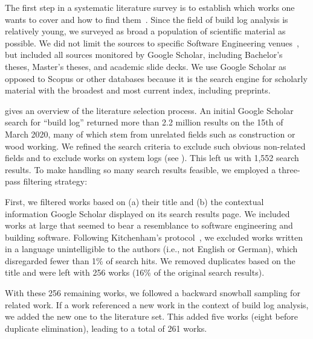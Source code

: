 \documentclass[10pt,journal,compsoc]{IEEEtran}
\begin{document}
The first step in a systematic literature survey is to
establish which works one wants to cover and how to find
them~\cite{kitchenham2009systematic}.
Since the field of build log analysis is relatively young, we
surveyed as broad a population of scientific material as possible.
We did not limit the sources to specific Software Engineering
venues~\cite{petersen2015guidelines}, but included all sources
monitored by Google Scholar, including Bachelor's theses, Master's
theses, and academic slide decks.
We use Google Scholar as opposed to Scopus or
other databases because it is the search engine for scholarly material
with
the broadest and most current index, including preprints.

 gives an overview of the literature selection
process.
An initial Google Scholar search for ``build log''
returned more than 2.2 million results on the 15th of March 2020, many
of which stem
from unrelated fields such as construction or wood working.
We refined the search criteria to exclude such obvious
non-related fields and to exclude works on system
logs (see ).
This left us with 1,552 search results.
To make handling so many search results feasible, we employed a
three-pass filtering strategy:

First, we filtered works based on (a) their title and (b) the
contextual information Google Scholar displayed on its search results
page.
We included works at large that seemed to bear a resemblance to software
engineering and building software.
Following Kitchenham's protocol~\cite{kitchenham2009systematic},
we excluded
works written in a language unintelligible to the authors
(i.e., not English or German), which disregarded fewer than 1\% of search
hits.
We removed duplicates based on the title and were
left with 256 works (16\% of the original search results).

With these 256 remaining works, we followed a backward snowball
sampling for related work.
If a work referenced a new work in the context
of build log analysis, we added the new one to the literature set.
This added five works (eight before
duplicate elimination), leading to a total of 261
works.
\end{document}

